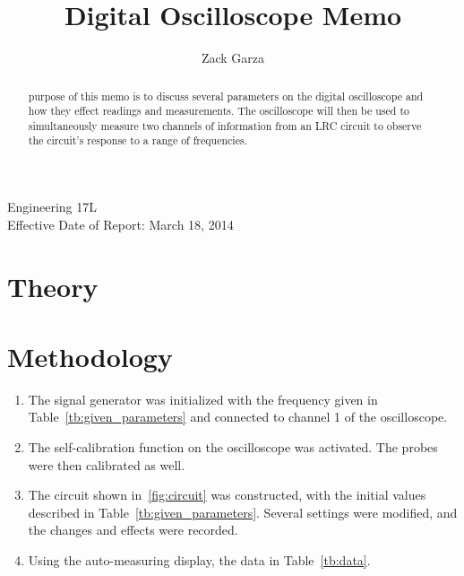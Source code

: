 \documentclass[twocolumn,english]{IEEEtran}
\theoremstyle{plain}
\theoremstyle{plain}
\begin{document}
\title{Digital Oscilloscope Memo}


\author{Zack Garza}


\IEEEspecialpapernotice
{Engineering 17L\\
Effective Date of Report: March 18, 2014}


\maketitle
\begin{abstract}
 purpose of this memo is to discuss several parameters on the digital oscilloscope and how they effect readings and measurements. The oscilloscope will then be used to simultaneously measure two channels of information from an LRC circuit to observe the circuit's response to a range of frequencies.
\end{abstract}

\tableofcontents

\section{Theory}

\section{Methodology}
\begin{enumerate}
 \item The signal generator was initialized with the frequency given in Table~\ref{tb:given_parameters} and connected to channel 1 of the oscilloscope.
 \item The self-calibration function on the oscilloscope was activated. The probes were then calibrated as well.
 \item The circuit shown in~\ref{fig:circuit} was constructed, with the initial values described in Table~\ref{tb:given_parameters}. Several settings were modified, and the changes and effects were recorded.
 \item Using the auto-measuring display, the data in Table~\ref{tb:data}.
\end{enumerate}
\end{document}
